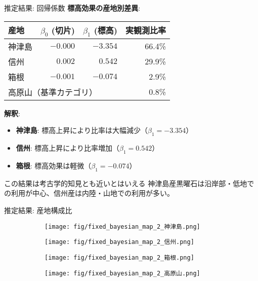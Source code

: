 \documentclass[xelatex, 8pt]{beamer}
\theoremstyle{plain}
\theoremstyle{definition}
\begin{document}
\begin{frame}{推定結果: 回帰係数}
    \textbf{標高効果の産地別差異}:

    \begin{table}
        \centering
        \begin{tabular}{l|rr|r}
            \hline
            産地 & $\beta_0$ (切片) & $\beta_1$ (標高) & 実観測比率 \\
            \hline
            神津島 & $-0.000$ & $-3.354$ & 66.4\% \\
            信州 & $0.002$ & $0.542$ & 29.9\% \\
            箱根 & $-0.001$ & $-0.074$ & 2.9\% \\
            \hline
            \multicolumn{3}{l}{高原山（基準カテゴリ）} & 0.8\% \\
            \hline
        \end{tabular}
    \end{table}

    \vspace{3mm}

    \textbf{解釈}:
    \begin{itemize}
        \item \textbf{神津島}: 標高上昇により比率は大幅減少（$\beta_1 = -3.354$）
        \item \textbf{信州}: 標高上昇により比率増加（$\beta_1 = 0.542$）
        \item \textbf{箱根}: 標高効果は軽微（$\beta_1 = -0.074$）
    \end{itemize}

    この結果は考古学的知見とも近いとはいえる 神津島産黒曜石は沿岸部・低地での利用が中心、信州産は内陸・山地での利用が多い。
\end{frame}

\begin{frame}{推定結果: 産地構成比}
    \begin{figure}
    \centering
    \begin{subfigure}{0.45\textwidth}
        \centering
        \texttt{[image: fig/fixed\_bayesian\_map\_2\_神津島.png]}
        \label{fig:sigma300}
    \end{subfigure}
    \hfill
    \begin{subfigure}{0.45\textwidth}
        \centering
        \texttt{[image: fig/fixed\_bayesian\_map\_2\_信州.png]}
        \label{fig:sigma700}
    \end{subfigure}

    \begin{subfigure}{0.45\textwidth}
        \centering
        \texttt{[image: fig/fixed\_bayesian\_map\_2\_箱根.png]}
        \label{fig:sigma1000}
    \end{subfigure}
        \hfill
    \begin{subfigure}{0.45\textwidth}
        \centering
        \texttt{[image: fig/fixed\_bayesian\_map\_2\_高原山.png]}
        \label{fig:sigma1500}
    \end{subfigure}
\end{figure}
\end{frame}
\end{document}
